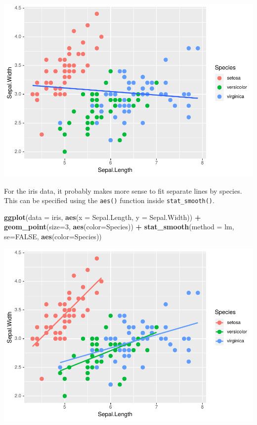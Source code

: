 \documentclass[
]{krantz}
\makeatletter
\newenvironment{Shaded}{\begin{snugshade}}{\end{snugshade}}
\newcommand{\DataTypeTok}[1]{\textcolor[rgb]{0.27,0.27,0.27}{#1}}
\newcommand{\DecValTok}[1]{\textcolor[rgb]{0.06,0.06,0.06}{#1}}
\newcommand{\KeywordTok}[1]{\textcolor[rgb]{0.27,0.27,0.27}{\textbf{#1}}}
\newcommand{\NormalTok}[1]{#1}
\newcommand{\OperatorTok}[1]{\textcolor[rgb]{0.43,0.43,0.43}{\textbf{#1}}}
\newcommand{\OtherTok}[1]{\textcolor[rgb]{0.37,0.37,0.37}{#1}}
\newcommand{\StringTok}[1]{\textcolor[rgb]{0.5,0.5,0.5}{#1}}
\newenvironment{kframe}{%
\medskip{}
\setlength{\fboxsep}{.8em}
 \def\at@end@of@kframe{}%
 \ifinner\ifhmode%
  \def\at@end@of@kframe{\end{minipage}}%
  \begin{minipage}{\columnwidth}%
 \fi\fi%
 \def\FrameCommand##1{\hskip\@totalleftmargin \hskip-\fboxsep
 \colorbox{shadecolor}{##1}\hskip-\fboxsep
     \hskip-\linewidth \hskip-\@totalleftmargin \hskip\columnwidth}%
 \MakeFramed {\advance\hsize-\width
   \@totalleftmargin\z@ \linewidth\hsize
   \@setminipage}}%
 {\par\unskip\endMakeFramed%
 \at@end@of@kframe}
\renewenvironment{Shaded}{\begin{kframe}}{\end{kframe}}
\makeatother
\begin{document}
\includegraphics{bookdown_files/figure-latex/unnamed-chunk-62-2.pdf}

For the iris data, it probably makes more sense to fit separate lines by species. This can be specified using the \texttt{aes()} function inside \texttt{stat\_smooth()}.

\begin{Shaded}
\begin{Highlighting}[]
\KeywordTok{ggplot}\NormalTok{(}\DataTypeTok{data =}\NormalTok{ iris, }\KeywordTok{aes}\NormalTok{(}\DataTypeTok{x =}\NormalTok{ Sepal.Length, }\DataTypeTok{y =}\NormalTok{ Sepal.Width)) }\OperatorTok{+}\StringTok{ }
\StringTok{    }\KeywordTok{geom\_point}\NormalTok{(}\DataTypeTok{size=}\DecValTok{3}\NormalTok{, }\KeywordTok{aes}\NormalTok{(}\DataTypeTok{color=}\NormalTok{Species)) }\OperatorTok{+}\StringTok{ }
\StringTok{    }\KeywordTok{stat\_smooth}\NormalTok{(}\DataTypeTok{method =}\NormalTok{ lm, }\DataTypeTok{se=}\OtherTok{FALSE}\NormalTok{, }\KeywordTok{aes}\NormalTok{(}\DataTypeTok{color=}\NormalTok{Species))}
\end{Highlighting}
\end{Shaded}

\includegraphics{bookdown_files/figure-latex/unnamed-chunk-63-1.pdf}
\end{document}
